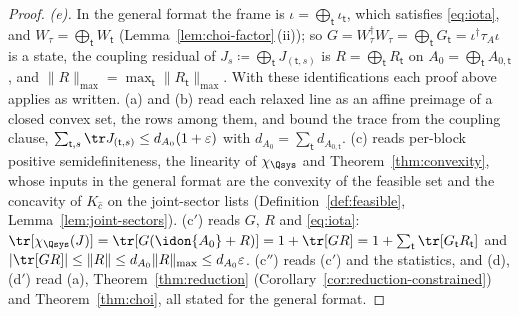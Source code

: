 \begin{proof}
\emph{(e).} In the general format the frame is
$\iota=\bigoplus_{\mathsf t}\iota_{\mathsf t}$, which satisfies
\eqref{eq:iota}, and $W_{\tau}=\bigoplus_{\mathsf t}W_{\mathsf t}$
(Lemma~\ref{lem:choi-factor}\,(ii)); so
$G=W_{\tau}^{\dagger}W_{\tau}=\bigoplus_{\mathsf t}G_{\mathsf t}
=\iota^{\dagger}\tau_A\iota$ is a state, the coupling residual of
$J_s\coloneqq\bigoplus_{\mathsf t}J_{(\mathsf t,s)}$ is
$R=\bigoplus_{\mathsf t}R_{\mathsf t}$ on
$A_0=\bigoplus_{\mathsf t}A_{0,\mathsf t}$, and
$\|R\|_{\max}=\max_{\mathsf t}\|R_{\mathsf t}\|_{\max}$. With these
identifications each proof above applies as written. (a) and (b) read each
relaxed line as an affine preimage of a closed convex set, the
 rows among them, and bound the trace from the coupling
clause, $\sum_{\mathsf t,s}\tr J_{(\mathsf t,s)}\le d_{A_0}(1+\varepsilon)$
with $d_{A_0}=\sum_{\mathsf t}d_{A_{0,\mathsf t}}$. (c) reads per-block
positive semidefiniteness, the linearity of $\chi_{\Qsys}$ and
Theorem~\ref{thm:convexity}, whose inputs in the general format are the
convexity of the feasible set and the concavity of $K_{\hat c}$ on the
joint-sector lists (Definition~\ref{def:feasible},
Lemma~\ref{lem:joint-sectors}). (c$'$) reads $G$, $R$ and \eqref{eq:iota}:
$\tr[\chi_{\Qsys}(J)]=\tr[G(\idon{A_0}+R)]=1+\tr[GR]
=1+\sum_{\mathsf t}\tr[G_{\mathsf t}R_{\mathsf t}]$ and
$|\tr[GR]|\le\|R\|\le d_{A_0}\|R\|_{\max}\le d_{A_0}\varepsilon$. (c$''$)
reads (c$'$) and the statistics, and (d), (d$'$) read (a),
Theorem~\ref{thm:reduction} (Corollary~\ref{cor:reduction-constrained})
and Theorem~\ref{thm:choi}, all stated for the general format.
\end{proof}

